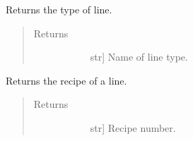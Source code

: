\documentclass[letterpaper,10pt,english,openany,oneside]{sphinxmanual}
\begin{document}
\begin{fulllineitems}
\begin{fulllineitems}
\begin{quote}
\begin{description}
\end{description}\end{quote}

\end{fulllineitems}


\begin{fulllineitems}
\label{\detokenize{reference:cnc.optimization.Line.get_line_type}}
Returns the type of line.
\begin{quote}\begin{description}
\item[{Returns}] \leavevmode\begin{description}
\item[{}] \leavevmode{[}str{]}
Name of line type.

\end{description}

\end{description}\end{quote}

\end{fulllineitems}


\begin{fulllineitems}
\label{\detokenize{reference:cnc.optimization.Line.get_recipe}}
Returns the recipe of a line.
\begin{quote}\begin{description}
\item[{Returns}] \leavevmode\begin{description}
\item[{}] \leavevmode{[}str{]}
Recipe number.

\end{description}

\end{description}\end{quote}

\end{fulllineitems}



\end{fulllineitems}
\end{document}
